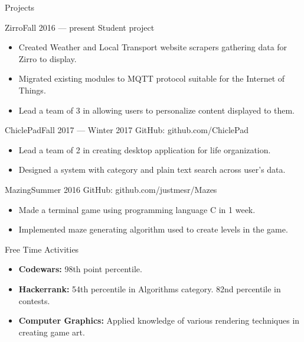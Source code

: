 \documentclass[]{mcdowellcv}
\begin{document}
	\begin{cvsection}{Projects}
		\begin{cvsubsection}{Zirro}{}{Fall 2016 — present}
			Student project
			\begin{itemize}
				\item Created Weather and Local Transport website scrapers gathering data for Zirro to display.
				\item Migrated existing modules to MQTT protocol suitable for the Internet of Things.
				\item Lead a team of 3 in allowing users to personalize content displayed to them.
			\end{itemize}
		\end{cvsubsection}

		\begin{cvsubsection}{ChiclePad}{}{Fall 2017 — Winter 2017}
			GitHub: github.com/ChiclePad
			\begin{itemize}
				\item Lead a team of 2 in creating desktop application for life organization.
				\item Designed a system with category and plain text search across user's data.
			\end{itemize}
		\end{cvsubsection}

		\begin{cvsubsection}{Mazing}{}{Summer 2016}
			GitHub: github.com/justmesr/Mazes
			\begin{itemize}
				\item Made a terminal game using programming language C in 1 week.
				\item Implemented maze generating algorithm used to create levels in the game. 
			\end{itemize}
		\end{cvsubsection}
	\end{cvsection}
	
	\begin{cvsection}{Free Time Activities}
		\begin{cvsubsection}{}{}{}	
			\begin{itemize}
				\item \textbf{Codewars:} 98th point percentile.
				\item \textbf{Hackerrank:} 54th percentile in Algorithms category. 82nd percentile in contests.
				\item \textbf{Computer Graphics:} Applied knowledge of various rendering techniques in creating game art.
			\end{itemize}
		\end{cvsubsection}
	\end{cvsection}
	
\end{document}
